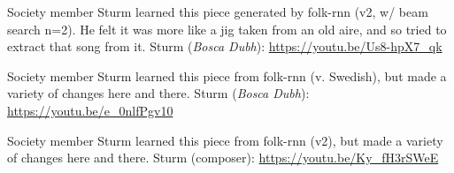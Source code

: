 \documentclass[a4paper,notitlepage,twoside]{book}
\begin{document}
{}  
\hypertarget{piece:Theyareeverywhere}{}
Society member Sturm learned this piece 
generated by folk-rnn (v2, w/ beam search n=2).
He felt it was more like a jig taken from an old aire,
and so tried to extract that song from it.
Sturm ({\em Bosca Dubh}): \url{https://youtu.be/Us8-hpX7_qk}

{}  
\hypertarget{piece:SlowWaltz}{}
Society member Sturm learned this piece from folk-rnn (v. Swedish),
but made a variety of changes here and there.
Sturm ({\em Bosca Dubh}): \url{https://youtu.be/e_0nlfPgv10}

{}  
\hypertarget{piece:Shadow}{}
Society member Sturm learned this piece from folk-rnn (v2),
but made a variety of changes here and there.
Sturm (composer): \url{https://youtu.be/Ky_fH3rSWeE}


%
%


\clearpage
\printindex

\backmatter 

\end{document}

